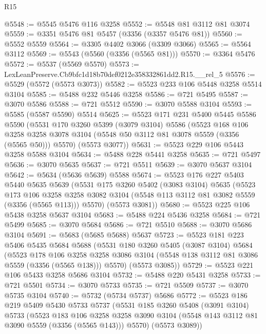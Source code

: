 \begin{lexlean}{R15}
\begin{coremodule}
@5548 := @5545 @5476 @116 @3258
@5552 := @5548 @81 @3112 @81 @3074
@5559 := @3351 @5476 @81 @5457 (@3356 (@3357 @5476 @81))
@5560 := @5552 @5559
@5564 := @3305 @4402 @3066 (@3309 @3066)
@5565 := @5564 @3112
@5569 := @5543 (@5560 (@3356 (@5565 @81)))
@5570 := @3364 @5476
@5572 := @5537 (@5569 @5570)
@5573 := LexLeanPreserve.Cb9bfc1d18b70def0212e358332861dd2.R15.__rel_5
@5576 := @5529 (@5572 (@5573 @3073))
@5582 := @5523 @233 @106 @5448 @3258 @5514 @3104
@5585 := @5488 @232 @5446 @3258
@5586 := @721 @5495
@5587 := @3070 @5586
@5588 := @721 @5512
@5590 := @3070 @5588 @3104
@5593 := @5585 (@5587 @5590) @5514
@5625 := @5523
    @171
    @231
    @5400
    @5445
    @5586
    @5590
    (@5531
      @170
      @3260
      @5399
      (@3079 @3104)
      @5586
      (@5523
        @168
        @106
        @3258
        @3258
        @3078
        @3104
        (@5548 @50 @3112 @81 @3078 @5559 (@3356 (@5565 @50)))
        @5570)
      (@5573 @3077))
@5631 := @5523 @229 @106 @5443 @3258 @5588 @3104
@5634 := @5488 @228 @5441 @3258
@5635 := @721 @5497
@5636 := @3070 @5635
@5637 := @721 @5511
@5639 := @3070 @5637 @3104
@5642 := @5634 (@5636 @5639) @5588
@5674 := @5523
    @176
    @227
    @5403
    @5440
    @5635
    @5639
    (@5531
      @175
      @3260
      @5402
      (@3083 @3104)
      @5635
      (@5523
        @173
        @106
        @3258
        @3258
        @3082
        @3104
        (@5548 @113 @3112 @81 @3082 @5559 (@3356 (@5565 @113)))
        @5570)
      (@5573 @3081))
@5680 := @5523 @225 @106 @5438 @3258 @5637 @3104
@5683 := @5488 @224 @5436 @3258
@5684 := @721 @5499
@5685 := @3070 @5684
@5686 := @721 @5510
@5688 := @3070 @5686 @3104
@5691 := @5683 (@5685 @5688) @5637
@5723 := @5523
    @181
    @223
    @5406
    @5435
    @5684
    @5688
    (@5531
      @180
      @3260
      @5405
      (@3087 @3104)
      @5684
      (@5523
        @178
        @106
        @3258
        @3258
        @3086
        @3104
        (@5548 @138 @3112 @81 @3086 @5559 (@3356 (@5565 @138)))
        @5570)
      (@5573 @3085))
@5729 := @5523 @221 @106 @5433 @3258 @5686 @3104
@5732 := @5488 @220 @5431 @3258
@5733 := @721 @5501
@5734 := @3070 @5733
@5735 := @721 @5509
@5737 := @3070 @5735 @3104
@5740 := @5732 (@5734 @5737) @5686
@5772 := @5523
    @186
    @219
    @5409
    @5430
    @5733
    @5737
    (@5531
      @185
      @3260
      @5408
      (@3091 @3104)
      @5733
      (@5523
        @183
        @106
        @3258
        @3258
        @3090
        @3104
        (@5548 @143 @3112 @81 @3090 @5559 (@3356 (@5565 @143)))
        @5570)
      (@5573 @3089))

\end{coremodule}
\end{lexlean}
